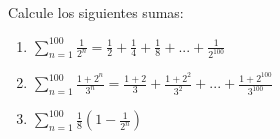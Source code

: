\begin{frame}

Calcule los siguientes sumas:

\begin{enumerate}
\item $\sum_{n=1}^{100} \frac{1}{2^n} = \frac{1}{2} + \frac{1}{4} + \frac{1}{8} + ... + \frac{1}{2^{100}}$
\item $\sum_{n=1}^{100} \frac{1+2^n}{3^n} = \frac{1+2}{3} + \frac{1+2^2}{3^2} + ... + \frac{1+2^{100}}{3^{100}}$
\item $\sum_{n=1}^{100} \frac{1}{8} (1 - \frac{1}{2^n})$
\end{enumerate}

\end{frame}


